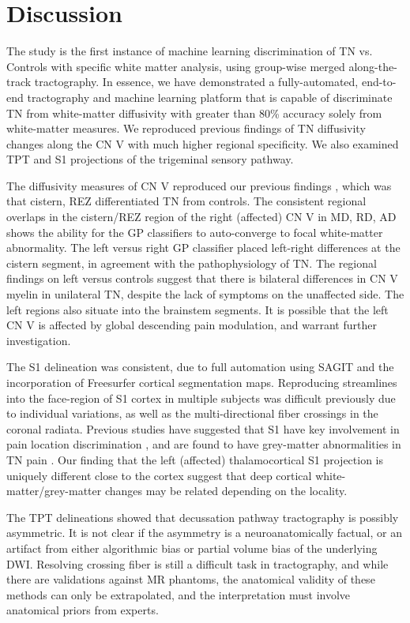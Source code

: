 \section{Discussion}
The study is the first instance of machine learning discrimination of TN vs. Controls with specific white matter analysis, using group-wise merged along-the-track tractography. In essence, we have demonstrated a fully-automated, end-to-end tractography and machine learning platform that is capable of discriminate TN from white-matter diffusivity with greater than 80\% accuracy solely from white-matter measures. We reproduced previous findings of TN diffusivity changes along the CN V with much higher regional specificity. We also examined TPT and S1 projections of the trigeminal sensory pathway.

The diffusivity measures of CN V reproduced our previous findings \cite{Chen2016a}, which was that cistern, REZ differentiated TN from controls. The consistent regional overlaps in the cistern/REZ region of the right (affected) CN V in MD, RD, AD shows the ability for the GP classifiers to auto-converge to focal white-matter abnormality. The left versus right GP classifier placed left-right differences at the cistern segment, in agreement with the pathophysiology of TN. The regional findings on left versus controls suggest that there is bilateral differences in CN V myelin in unilateral TN, despite the lack of symptoms on the unaffected side. The left regions also situate into the brainstem segments. It is possible that the left CN V is affected by global descending pain modulation, and warrant further investigation. 

The S1 delineation was consistent, due to full automation using SAGIT and the incorporation of Freesurfer cortical segmentation maps. Reproducing streamlines into the face-region of S1 cortex in multiple subjects was difficult previously due to individual variations, as well as the multi-directional fiber crossings in the coronal radiata. Previous studies have suggested that S1 have key involvement in pain location discrimination \cite{bushnell1999pain}, and are found to have grey-matter abnormalities in TN pain \cite{Desouza2013c}. Our finding that the left (affected) thalamocortical S1 projection is uniquely different close to the cortex suggest that deep cortical white-matter/grey-matter changes may be related depending on the locality. 

The TPT delineations showed that decussation pathway tractography is possibly asymmetric. It is not clear if the asymmetry is a neuroanatomically factual, or an artifact from either algorithmic bias or partial volume bias of the underlying DWI. Resolving crossing fiber is still a difficult task in tractography, and while there are validations against MR phantoms, the anatomical validity of these methods can only be extrapolated, and the interpretation must involve anatomical priors from experts.  

